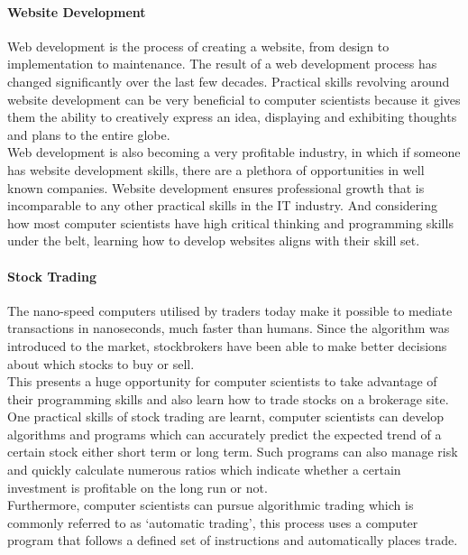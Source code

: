 \documentclass[a4paper, 11pt]{report}
\begin{document}
	\paragraph{Website Development} Web development is the process of creating a website, from design to implementation to maintenance. The result of a web development process has changed significantly over the last few decades. Practical skills revolving around website development can be very beneficial to computer scientists because it gives them the ability to creatively express an idea, displaying and exhibiting thoughts and plans to the entire globe. 
	\\ Web development is also becoming a very profitable industry, in which if someone has website development skills, there are a plethora of opportunities in well known companies. Website development ensures professional growth that is incomparable to any other practical skills in the IT industry. And considering how most computer scientists have high critical thinking and programming skills under the belt, learning how to develop websites aligns with their skill set. 
	
	\paragraph {Stock Trading} The nano-speed computers utilised by traders today make it possible to mediate transactions in nanoseconds, much faster than humans. Since the algorithm was introduced to the market, stockbrokers have been able to make better decisions about which stocks to buy or sell. 
	\\ This presents a huge opportunity for computer scientists to take advantage of their programming skills and also learn how to trade stocks on a brokerage site. One practical skills of stock trading are learnt, computer scientists can develop algorithms and programs which can accurately predict the expected trend of a certain stock either short term or long term. Such programs can also manage risk and quickly calculate numerous ratios which indicate whether a certain investment is profitable on the long run or not. 
	\\ Furthermore, computer scientists can pursue algorithmic trading which is commonly referred to as ‘automatic trading’, this process uses a computer program that follows a defined set of instructions and automatically places trade. 
	
\end{document}
